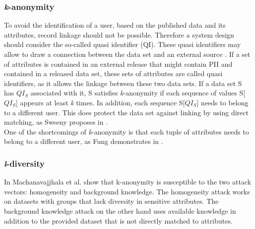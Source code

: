         \subsubsection{\textit{k}-anonymity}
            \label{subsec:related:kanon}
            To avoid the identification of a user, based on the published data and its attributes, record linkage should not be possible. Therefore a system design should consider the so-called quasi identifier (QI). These quasi identifiers may allow to draw a connection between the data set and an external source \cite{sweeney_k-anonymity_2002}.
            If a set of attributes is contained in an external release that might contain PII and contained in a released data set, these sets of attributes are called quasi identifiers, as it allows the linkage between these two data sets.
            If a data set S has $QI_S$ associated with it, S satisfies \textit{k}-anonymity if each sequence of values S[$QI_S$] appears at least \textit{k} times. 
        	In addition, each sequence S[$QI_S$] needs to belong to a different user.
        	This does protect the data set against linking by using direct matching, as Sweeny proposes in  \cite{sweeney_k-anonymity_2002}.\\
            
            One of the shortcomings of \textit{k}-anonymity is that each tuple of attributes needs to belong to a different user, as Fung demonstrates in  \cite{fung_introduction_2011}.

        \subsubsection{\textit{l}-diversity}
            \label{subsec:related:l-div}
            In  \cite{machanavajjhala_l-diversity_2007} Machanavajjhala et al. show that k-anonymity is susceptible to the two attack vectors: homogeneity and background knowledge.
            The homogeneity attack works on datasets with groups that lack diversity in sensitive attributes. The background knowledge attack on the other hand uses available knowledge in addition to the provided dataset that is not directly matched to attributes.\\
            

